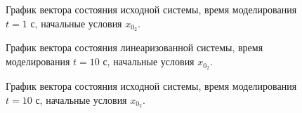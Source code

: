 \begin{figure}[!h]
\caption{График вектора состояния исходной системы, время моделирования $t=1$ с, начальные условия $x_{0_2}$.}
\label{2_x_nlin_02_sm}
\end{figure}

\begin{figure}[!h]
\caption{График вектора состояния линеаризованной системы, время моделирования $t=10$ с, начальные условия $x_{0_2}$.}
\label{2_x_lin_02_lg}
\end{figure}

\begin{figure}[!h]
\caption{График вектора состояния исходной системы, время моделирования $t=10$ с, начальные условия $x_{0_2}$.}
\label{2_x_nlin_02_lg}
\end{figure}




